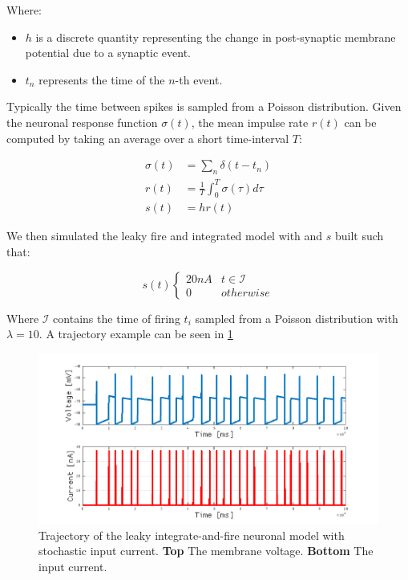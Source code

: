 		Where:

		\begin{itemize}
			\item $h$ is a discrete quantity representing the change in post-synaptic membrane potential due to a synaptic event.
			\item $t_n$ represents the time of the $n$-th event.
		\end{itemize}

		Typically the time between spikes is sampled from a Poisson distribution.
		Given the neuronal response function $\sigma(t)$, the mean impulse rate $r(t)$ can be computed by taking an average over a short time-interval $T$:

		\begin{equation}
			\begin{aligned}
				\sigma(t) &= \sum\limits_n\delta(t-t_n)\\
				r(t) &= \frac{1}{T}\int_0^T\sigma(\tau)d\tau\\
				s(t) &= hr(t)
			\end{aligned}
		\end{equation}

		We then simulated the leaky fire and integrated model with and $s$ built such that:

		$$s(t)\begin{cases}20nA & t\in\mathcal{I}\\0 &otherwise\end{cases}$$

		Where $\mathcal{I}$ contains the time of firing $t_i$ sampled from a Poisson distribution with $\lambda = 10$.
		A trajectory example can be seen in \ref{fig:stochastic-neuron}

		\begin{figure}
			\includegraphics[width=\textwidth]{Figures/stochastic-neuron}
			\caption{Trajectory of the leaky integrate-and-fire neuronal model with stochastic input current. \textbf{Top} The membrane voltage. \textbf{Bottom} The input current.}
			\label{fig:stochastic-neuron}
		\end{figure}

